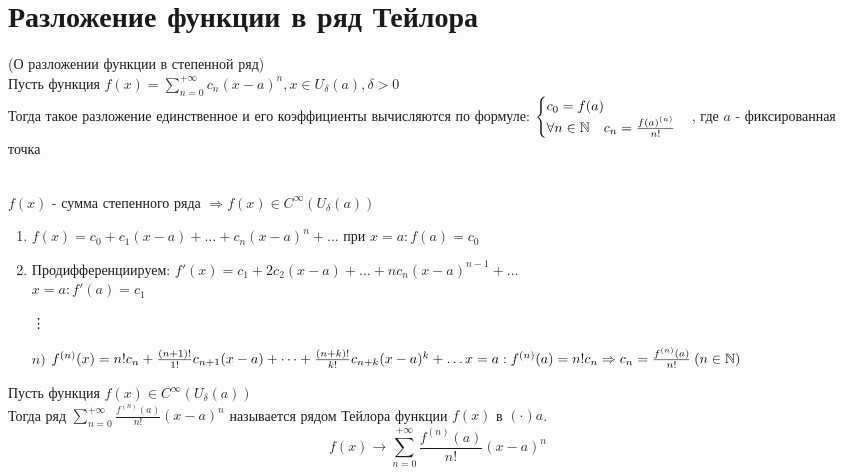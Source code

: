 \section{Разложение функции в ряд Тейлора}

\newcommand*\circled[1]{\tikz[baseline=(char.base)]{
		\node[shape=circle,draw,inner sep=2pt] (char) {#1};}}

\begin{Th}(О разложении функции в степенной ряд)\\
	Пусть функция $f(x) = \sum\limits_{n=0}^{+\infty}c_n(x-a)^n, x \in U_{\delta}(a), \delta > 0$\\
	Тогда такое разложение единственное и его коэффициенты вычисляются по формуле: 
	$\begin{cases}
	  c_0 = f(a)\\
	  \forall n \in \mathbb{N} \quad c_n =\frac{f(a)^{(n)}}{n!}
	\end{cases}$, где $a$ - фиксированная точка
\end{Th}

\begin{Proof}\\
	$f(x)$ - сумма степенного ряда $\Rightarrow f(x) \in C^{\infty}(U_{\delta}(a))$
	\begin{enumerate}[noitemsep]
		\item $f(x) = c_0 + c_1(x-a) + \dots + c_n(x-a)^n + \dots$ при $x=a: f(a) = c_0$
		\item Продифференциируем: $f'(x) = c_1 + 2c_2(x-a) + \dots + nc_n(x-a)^{n-1} + \dots$\\
			$x=a: f'(a) = c_1$
		\item[\vdots]
		\item[$n)$]$f^{(n)}(x) = n!c_n + \frac{(n+1)!}{1!}c_{n+1}(x-a) + \dots + \frac{(n+k)!}{k!}c_{n+k}(x-a)^k + \dots\\
			x = a: f^{(n)}(a) = n!c_n \Rightarrow c_n = \frac{f^{(n)}(a)}{n!} \: (n \in \mathbb{N})$
	\end{enumerate}
\end{Proof}

\begin{Def}
	Пусть функция $f(x) \in C^{\infty}(U_{\delta}(a))$\\
	Тогда ряд $\sum\limits_{n=0}^{+\infty}\frac{f^{(n)}(a)}{n!}(x-a)^n$ называется рядом Тейлора функции $f(x)$ в $(\cdot) a$. 
	$$f(x) \to \sum\limits_{n=0}^{+\infty}\frac{f^{(n)}(a)}{n!}(x-a)^n$$
\end{Def}

